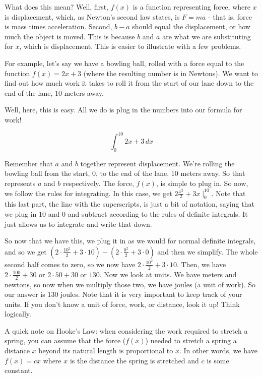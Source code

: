\documentclass{memoir}
\begin{document}
What does this mean? 
Well, first, $f(x)$ is a function representing force, where $x$ is displacement, which, as Newton's second law states, is $F = ma$ - that is, force is mass times acceleration. 
Second, $b - a$ should equal the displacement, or how much the object is moved. This is because $b$ and $a$ are what we are substituting for $x$, which is displacement.
This is easier to illustrate with a few problems.

For example, let's say we have a bowling ball, rolled with a force equal to the function $f(x) = 2x+3$ (where the resulting number is in Newtons). 
We want to find out how much work it takes to roll it from the start of our lane down to the end of the lane, 10 meters away.

Well, here, this is easy. All we do is plug in the numbers into our formula for work! 

\begin{equation*}
    \int^{10}_0 2x+3 \, dx
\end{equation*}

Remember that $a$ and $b$ together represent displacement. 
We're rolling the bowling ball from the start, $0$, to the end of the lane, $10$ meters away. 
So that represents $a$ and $b$ respectively. 
The force, $f(x)$, is simple to plug in. 
So now, we follow the rules for integrating. 
In this case, we get $2\frac{x^2}{2}+3x\mid^{10}_0$. 
Note that this last part, the line with the superscripts, is just a bit of notation, saying that we plug in $10$ and $0$ and subtract according to the rules of definite integrals. 
It just allows us to integrate and write that down. 

So now that we have this, we plug it in as we would for normal definite integrals, and so we get $(2\cdot\frac{10^2}{2}+3\cdot 10) - (2\cdot\frac{0^2}{2}+3\cdot 0)$ and then we simplify. 
The whole second half comes to zero, so we now have $2\cdot\frac{10^2}{2}+3\cdot 10$. 
Then, we have $2\cdot \frac{100}{2}+ 30$ or $2\cdot 50 + 30$ or $130$. 
Now we look at units. 
We have meters and newtons, so now when we multiply those two, we have joules (a unit of work). 
So our answer is $130$ joules. 
Note that it is very important to keep track of your units. If you don't know a unit of force, work, or distance, look it up! Think logically.

A quick note on Hooke's Law: when considering the work required to stretch a spring, you can assume that the force ($f(x)$) needed to stretch a spring a distance $x$ beyond its natural length is proportional to $x$. 
In other words, we have $f(x) = cx$ where $x$ is the distance the spring is stretched and $c$ is some constant.
\end{document}
